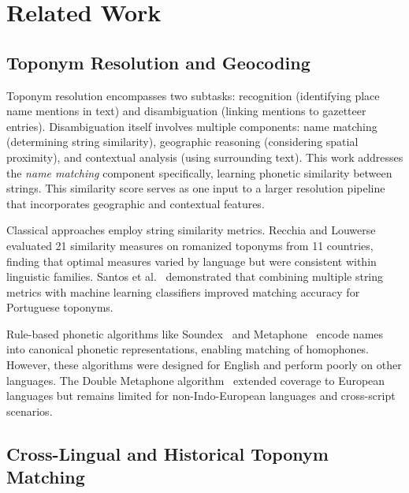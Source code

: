 \documentclass[11pt]{article}
\begin{document}


    \section{Related Work}
    \label{sec:related}

    \subsection{Toponym Resolution and Geocoding}

    Toponym resolution encompasses two subtasks: recognition (identifying place name mentions in text) and disambiguation (linking mentions to gazetteer entries). Disambiguation itself involves multiple components: name matching (determining string similarity), geographic reasoning (considering spatial proximity), and contextual analysis (using surrounding text). This work addresses the \emph{name matching} component specifically, learning phonetic similarity between strings. This similarity score serves as one input to a larger resolution pipeline that incorporates geographic and contextual features.

    Classical approaches employ string similarity metrics. Recchia and Louwerse~\citep{recchia2013} evaluated 21 similarity measures on romanized toponyms from 11 countries, finding that optimal measures varied by language but were consistent within linguistic families. Santos et al.~\citep{santos2018} demonstrated that combining multiple string metrics with machine learning classifiers improved matching accuracy for Portuguese toponyms.

    Rule-based phonetic algorithms like Soundex~\citep{odell1918} and Metaphone~\citep{philips1990} encode names into canonical phonetic representations, enabling matching of homophones. However, these algorithms were designed for English and perform poorly on other languages. The Double Metaphone algorithm~\citep{philips2000} extended coverage to European languages but remains limited for non-Indo-European languages and cross-script scenarios.

    \subsection{Cross-Lingual and Historical Toponym Matching}
\end{document}
